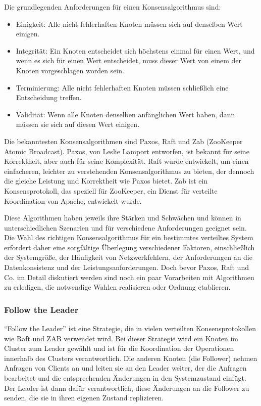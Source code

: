 Die grundlegenden Anforderungen für einen Konsensalgorithmus sind:
\begin{itemize}
\item Einigkeit: Alle nicht fehlerhaften Knoten müssen sich auf denselben Wert einigen.
\item Integrität: Ein Knoten entscheidet sich höchstens einmal für einen Wert, und wenn es sich für einen Wert entscheidet, muss dieser Wert von einem der Knoten vorgeschlagen worden sein.
\item Terminierung: Alle nicht fehlerhaften Knoten müssen schließlich eine Entscheidung treffen.
\item Validität: Wenn alle Knoten denselben anfänglichen Wert haben, dann müssen sie sich auf diesen Wert einigen.
\end{itemize}
Die bekanntesten Konsensalgorithmen sind Paxos, Raft und Zab (ZooKeeper Atomic Broadcast). Paxos, von Leslie Lamport entworfen, ist bekannt für seine Korrektheit, aber auch für seine Komplexität. Raft wurde entwickelt, um einen einfacheren, leichter zu verstehenden Konsensalgorithmus zu bieten, der dennoch die gleiche Leistung und Korrektheit wie Paxos bietet. Zab ist ein Konsensprotokoll, das speziell für ZooKeeper, ein Dienst für verteilte Koordination von Apache, entwickelt wurde.

Diese Algorithmen haben jeweils ihre Stärken und Schwächen und können in unterschiedlichen Szenarien und für verschiedene Anforderungen geeignet sein. Die Wahl des richtigen Konsensalgorithmus für ein bestimmtes verteiltes System erfordert daher eine sorgfältige Überlegung verschiedener Faktoren, einschließlich der Systemgröße, der Häufigkeit von Netzwerkfehlern, der Anforderungen an die Datenkonsistenz und der Leistungsanforderungen. Doch bevor Paxos, Raft und Co. im Detail diskutiert werden sind noch ein paar Vorarbeiten mit Algorithmen zu erledigen, die notwendige Wahlen realisieren oder Ordnung etablieren.

\subsubsection{Follow the Leader}
\enquote{Follow the Leader} ist eine Strategie, die in vielen verteilten Konsensprotokollen wie Raft und ZAB verwendet wird. Bei dieser Strategie wird ein Knoten im Cluster zum Leader gewählt und ist für die Koordination der Operationen innerhalb des Clusters verantwortlich. Die anderen Knoten (die Follower) nehmen Anfragen von Clients an und leiten sie an den Leader weiter, der die Anfragen bearbeitet und die entsprechenden Änderungen in den Systemzustand einfügt. Der Leader ist dann dafür verantwortlich, diese Änderungen an die Follower zu senden, die sie in ihren eigenen Zustand replizieren.

